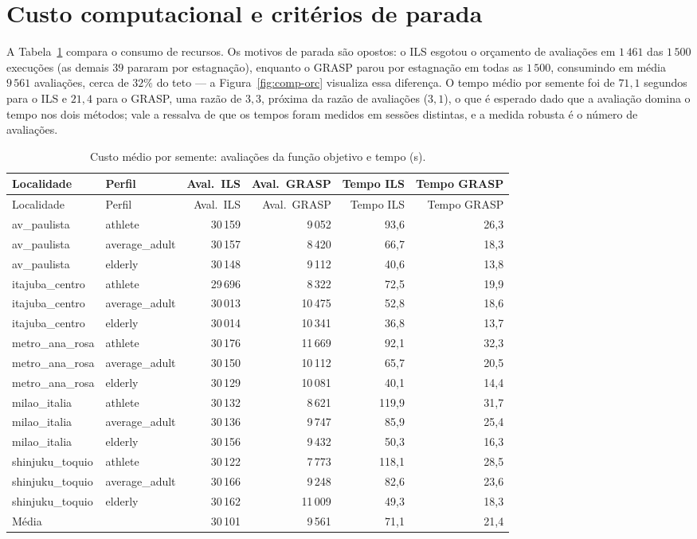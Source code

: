 \documentclass[11pt,a4paper]{article}
\begin{document}
\section{Custo computacional e critérios de parada}
\label{sec:comp-custo}

A Tabela~\ref{tab:comp-custo} compara o consumo de recursos. Os motivos de parada são opostos: o ILS esgotou o orçamento de avaliações em $1\,461$ das $1\,500$ execuções (as demais $39$ pararam por estagnação), enquanto o GRASP parou por estagnação em todas as $1\,500$, consumindo em média $9\,561$ avaliações, cerca de $32\%$ do teto — a Figura~\ref{fig:comp-orc} visualiza essa diferença. O tempo médio por semente foi de $71{,}1$ segundos para o ILS e $21{,}4$ para o GRASP, uma razão de $3{,}3$, próxima da razão de avaliações ($3{,}1$), o que é esperado dado que a avaliação domina o tempo nos dois métodos; vale a ressalva de que os tempos foram medidos em sessões distintas, e a medida robusta é o número de avaliações.

\renewcommand{\arraystretch}{1.12}
\begin{longtable}{@{}l l r r r r@{}}
\caption{Custo médio por semente: avaliações da função objetivo e tempo (s).}\label{tab:comp-custo}\\
\toprule
Localidade & Perfil & Aval.\ ILS & Aval.\ GRASP & Tempo ILS & Tempo GRASP \\
\midrule
\endfirsthead
\toprule
Localidade & Perfil & Aval.\ ILS & Aval.\ GRASP & Tempo ILS & Tempo GRASP \\
\midrule
\endhead
av\_paulista & athlete & 30\,159 & 9\,052 & 93,6 & 26,3 \\
av\_paulista & average\_adult & 30\,157 & 8\,420 & 66,7 & 18,3 \\
av\_paulista & elderly & 30\,148 & 9\,112 & 40,6 & 13,8 \\
itajuba\_centro & athlete & 29\,696 & 8\,322 & 72,5 & 19,9 \\
itajuba\_centro & average\_adult & 30\,013 & 10\,475 & 52,8 & 18,6 \\
itajuba\_centro & elderly & 30\,014 & 10\,341 & 36,8 & 13,7 \\
metro\_ana\_rosa & athlete & 30\,176 & 11\,669 & 92,1 & 32,3 \\
metro\_ana\_rosa & average\_adult & 30\,150 & 10\,112 & 65,7 & 20,5 \\
metro\_ana\_rosa & elderly & 30\,129 & 10\,081 & 40,1 & 14,4 \\
milao\_italia & athlete & 30\,132 & 8\,621 & 119,9 & 31,7 \\
milao\_italia & average\_adult & 30\,136 & 9\,747 & 85,9 & 25,4 \\
milao\_italia & elderly & 30\,156 & 9\,432 & 50,3 & 16,3 \\
shinjuku\_toquio & athlete & 30\,122 & 7\,773 & 118,1 & 28,5 \\
shinjuku\_toquio & average\_adult & 30\,166 & 9\,248 & 82,6 & 23,6 \\
shinjuku\_toquio & elderly & 30\,162 & 11\,009 & 49,3 & 18,3 \\
\midrule
\multicolumn{2}{l}{Média} & 30\,101 & 9\,561 & 71,1 & 21,4 \\
\bottomrule
\end{longtable}
\end{document}
